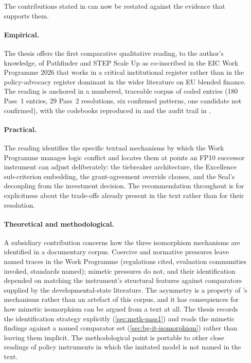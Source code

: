 The contributions stated in  can now be
restated against the evidence that supports them.

\paragraph{Empirical.}
The thesis offers the first comparative qualitative reading, to the
author's knowledge, of Pathfinder and STEP Scale Up as co-inscribed in
the EIC Work Programme 2026 that works in a critical institutional
register rather than in the policy-advocacy register dominant in the
wider literature on EU blended finance. The reading is anchored in a
numbered, traceable corpus of coded entries (180 Pass~1 entries, 29
Pass~2 resolutions, six confirmed patterns, one candidate not
confirmed), with the codebooks reproduced in
 and the audit
trail in .

\paragraph{Practical.}
The reading identifies the specific textual mechanisms by which the
Work Programme manages logic conflict and locates them at points an
FP10 successor instrument can adjust deliberately: the tiebreaker
architecture, the Excellence sub-criterion embedding, the
grant-agreement override clauses, and the Seal's decoupling from the
investment decision. The recommendation throughout
 is for explicitness about the trade-offs
already present in the text rather than for their resolution.

\paragraph{Theoretical and methodological.}
A subsidiary contribution concerns how the three isomorphism mechanisms
are identified in a documentary corpus. Coercive and normative
pressures leave named traces in the Work Programme (regulations cited,
evaluation communities invoked, standards named); mimetic pressures do
not, and their identification depended on matching the instrument's
structural features against comparators supplied by the
developmental-state literature. The asymmetry is a property of
\textcite{dimaggio1983iron}'s mechanisms rather than an artefact of
this corpus, and it has consequences for how mimetic isomorphism can be
argued from a text at all. The thesis records the identification
strategy explicitly (\cref{sec:meth-pass1}) and reads the mimetic
findings against a named comparator set (\cref{sec:bg-it-isomorphism})
rather than leaving them implicit. The methodological point is portable
to other close readings of policy instruments in which the imitated
model is not named in the text.


